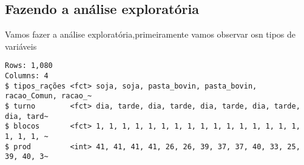 \documentclass[
  letterpaper,
  DIV=11,
  numbers=noendperiod]{scrartcl}
\newenvironment{Shaded}{\begin{snugshade}}{\end{snugshade}}
\newcommand{\CommentTok}[1]{\textcolor[rgb]{0.37,0.37,0.37}{#1}}
\newcommand{\FunctionTok}[1]{\textcolor[rgb]{0.28,0.35,0.67}{#1}}
\newcommand{\NormalTok}[1]{\textcolor[rgb]{0.00,0.23,0.31}{#1}}
\newcommand{\OtherTok}[1]{\textcolor[rgb]{0.00,0.23,0.31}{#1}}
\newcommand{\SpecialCharTok}[1]{\textcolor[rgb]{0.37,0.37,0.37}{#1}}
\begin{document}
\subsection{Fazendo a análise
exploratória}\label{fazendo-a-anuxe1lise-exploratuxf3ria}

Vamos fazer a análise exploratória,primeiramente vamos observar osn
tipos de variáveis

\begin{Shaded}
\end{Shaded}

\begin{verbatim}
Rows: 1,080
Columns: 4
$ tipos_rações <fct> soja, soja, pasta_bovin, pasta_bovin, racao_Comun, racao_~
$ turno        <fct> dia, tarde, dia, tarde, dia, tarde, dia, tarde, dia, tard~
$ blocos       <fct> 1, 1, 1, 1, 1, 1, 1, 1, 1, 1, 1, 1, 1, 1, 1, 1, 1, 1, 1, ~
$ prod         <int> 41, 41, 41, 41, 26, 26, 39, 37, 37, 40, 33, 25, 39, 40, 3~
\end{verbatim}
\end{document}

